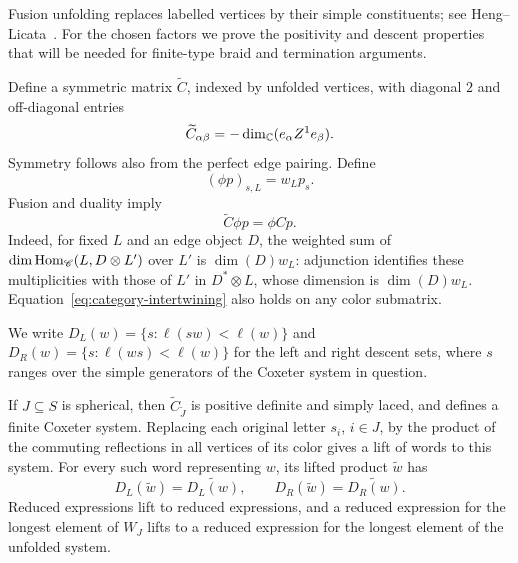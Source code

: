 Fusion unfolding replaces labelled vertices by their simple constituents;
see Heng--Licata~\cite[Section~8]{HengLicata2024}.
For the chosen factors we prove the positivity and descent properties
that will be needed for finite-type braid and termination arguments.

Define a symmetric matrix $\widetilde C$, indexed by unfolded vertices,
with diagonal $2$ and off-diagonal entries
\[
 \widetilde C_{\alpha\beta}
       =-\dim_\mathbb C(e_\alpha Z^1e_\beta).
\]
Symmetry follows also from the perfect edge pairing. Define
\begin{equation}
 (\phi p)_{s,L}=w_Lp_s.
 \label{eq:category-phi}
\end{equation}
Fusion and duality imply
\begin{equation}
 \widetilde C\phi p=\phi Cp.
 \label{eq:category-intertwining}
\end{equation}
Indeed, for fixed $L$ and an edge object $D$, the weighted sum of
$\dim\operatorname{Hom}_{\mathscr C}(L,D\otimes L')$ over $L'$ is
$\dim(D)w_L$: adjunction identifies these multiplicities with those
of $L'$ in $D^*\otimes L$, whose dimension is $\dim(D)w_L$.
Equation~\eqref{eq:category-intertwining} also holds on any color
submatrix.

We write $D_L(w)=\{s:\ell(sw)<\ell(w)\}$ and
$D_R(w)=\{s:\ell(ws)<\ell(w)\}$ for the left and right descent sets,
where $s$ ranges over the simple generators of the Coxeter system
in question.

\begin{lemma}
\label{lem:finite-unfolding}
If $J\subseteq S$ is spherical, then $\widetilde C_{\widetilde J}$
is positive definite and simply laced, and defines a finite Coxeter
system. Replacing each original letter $s_i$, $i\in J$, by the product
of the commuting reflections in all vertices of its color gives a
lift of words to this system. For every such word representing $w$,
its lifted product $\widetilde w$ has
\begin{equation}
 D_L(\widetilde w)=\widetilde{D_L(w)},\qquad
 D_R(\widetilde w)=\widetilde{D_R(w)}.
 \label{eq:category-descents}
\end{equation}
Reduced expressions lift to reduced expressions, and a reduced
expression for the longest element of $W_J$ lifts to a reduced
expression for the longest element of the unfolded system.
\end{lemma}

